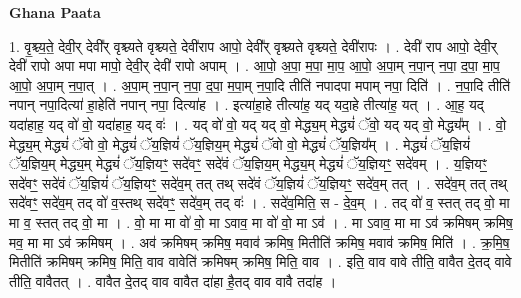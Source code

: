 \documentclass[17pt]{extarticle}
\begin{document}
\textbf{Ghana Paata } \newline

1. वृ॒श्च्य॒ते॒ देवी॒र् देवी᳚र् वृश्च्यते वृश्च्यते॒ देवी॑राप आपो॒ देवी᳚र् वृश्च्यते वृश्च्यते॒ देवी॑रापः । . देवी॑ राप आपो॒ देवी॒र् देवी॑ रापो अपा मपा मापो॒ देवी॒र् देवी॑ रापो अपाम् । . आ॒पो॒ अ॒पा॒ म॒पा॒ मा॒प॒ आ॒पो॒ अ॒पा॒म् न॒पा॒न् न॒पा॒ द॒पा॒ मा॒प॒ आ॒पो॒ अ॒पा॒म् न॒पा॒त् । . अ॒पा॒म् न॒पा॒न् न॒पा॒ द॒पा॒ म॒पा॒म् न॒पा॒दि तीति॑ नपादपा मपाम् नपा॒ दिति॑ । . न॒पा॒दि तीति॑ नपान् नपा॒दित्या॑ हा॒हेति॑ नपान् नपा॒ दित्या॑ह । . इत्या॑हा॒हे तीत्या॑ह॒ यद् यदा॒हे तीत्या॑ह॒ यत् । . आ॒ह॒ यद् यदा॑हाह॒ यद् वो॑ वो॒ यदा॑हाह॒ यद् वः॑ । . यद् वो॑ वो॒ यद् यद् वो॒ मेद्ध्य॒म् मेद्ध्यं॑ ॅवो॒ यद् यद् वो॒ मेद्ध्य᳚म् । . वो॒ मेद्ध्य॒म् मेद्ध्यं॑ ॅवो वो॒ मेद्ध्यं॑ ॅय॒ज्ञियं॑ ॅय॒ज्ञिय॒म् मेद्ध्यं॑ ॅवो वो॒ मेद्ध्यं॑ ॅय॒ज्ञिय᳚म् । . मेद्ध्यं॑ ॅय॒ज्ञियं॑ ॅय॒ज्ञिय॒म् मेद्ध्य॒म् मेद्ध्यं॑ ॅय॒ज्ञियꣳ॒॒ सदे॑वꣳ॒॒ सदे॑वं ॅय॒ज्ञिय॒म् मेद्ध्य॒म् मेद्ध्यं॑ ॅय॒ज्ञियꣳ॒॒ सदे॑वम् । . य॒ज्ञियꣳ॒॒ सदे॑वꣳ॒॒ सदे॑वं ॅय॒ज्ञियं॑ ॅय॒ज्ञियꣳ॒॒ सदे॑व॒म् तत् तथ् सदे॑वं ॅय॒ज्ञियं॑ ॅय॒ज्ञियꣳ॒॒ सदे॑व॒म् तत् । . सदे॑व॒म् तत् तथ् सदे॑वꣳ॒॒ सदे॑व॒म् तद् वो॑ व॒स्तथ् सदे॑वꣳ॒॒ सदे॑व॒म् तद् वः॑ । . सदे॑व॒मिति॒ स - दे॒व॒म् । . तद् वो॑ व॒ स्तत् तद् वो॒ मा मा व॒ स्तत् तद् वो॒ मा । . वो॒ मा मा वो॑ वो॒ मा ऽवाव॒ मा वो॑ वो॒ मा ऽव॑ । . मा ऽवाव॒ मा मा ऽव॑ क्रमिषम् क्रमिष॒ मव॒ मा मा ऽव॑ क्रमिषम् । . अव॑ क्रमिषम् क्रमिष॒ मवाव॑ क्रमिष॒ मितीति॑ क्रमिष॒ मवाव॑ क्रमिष॒ मिति॑ । . क्र॒मि॒ष॒ मितीति॑ क्रमिषम् क्रमिष॒ मिति॒ वाव वावेति॑ क्रमिषम् क्रमिष॒ मिति॒ वाव । . इति॒ वाव वावे तीति॒ वावैत दे॒तद् वावे तीति॒ वावैतत् । . वावैत दे॒तद् वाव वावैत दा॑हा है॒तद् वाव वावै तदा॑ह । \newline
\end{document}
